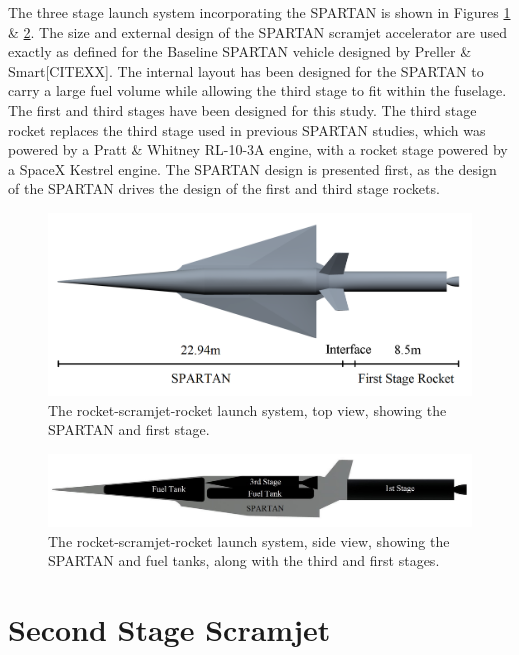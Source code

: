  The three stage launch system incorporating the SPARTAN is shown in Figures \ref{fig:NoInternal} \& \ref{fig:INTERNALS}. 
 The size and external design of the SPARTAN scramjet accelerator are used exactly as defined for the Baseline SPARTAN vehicle designed by Preller \& Smart[CITEXX]. The internal layout has been designed for the SPARTAN to carry a large fuel volume while allowing the third stage to fit within the fuselage. 
 The first and third stages have been designed for this study. The third stage rocket replaces the third stage used in previous SPARTAN studies, which was powered by a Pratt \& Whitney RL-10-3A engine, with a rocket stage powered by a SpaceX Kestrel engine.  
The SPARTAN design is presented first, as the design of the SPARTAN drives the design of the first and third stage rockets. 


\begin{figure}[ht]
	\centering
	\includegraphics[width=0.7\linewidth]{figures/3_vehicle_design/NoInternal}
	\caption{The rocket-scramjet-rocket launch system, top view, showing the SPARTAN and first stage. }
	\label{fig:NoInternal}
\end{figure}

\begin{figure}[ht]
	\centering
	\includegraphics[width=0.7\linewidth]{figures/3_vehicle_design/INTERNALS}
	\caption{The rocket-scramjet-rocket launch system, side view, showing the SPARTAN and fuel tanks, along with the third and first stages.}
	\label{fig:INTERNALS}
\end{figure}









	
	
	\section{Second Stage Scramjet}

